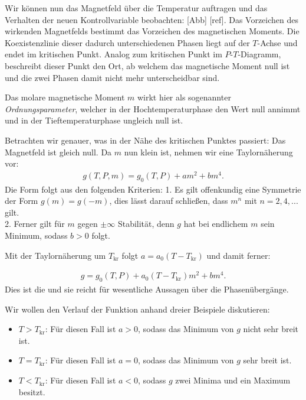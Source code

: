 Wir können nun das Magnetfeld über die Temperatur auftragen und das Verhalten der neuen Kontrollvariable beobachten: [Abb] [ref].
Das Vorzeichen des wirkenden Magnetfelds bestimmt das Vorzeichen des magnetischen Moments. Die Koexistenzlinie dieser dadurch unterschiedenen Phasen liegt auf der $T$-Achse und endet im kritischen Punkt. Analog zum kritischen Punkt im $P$-$T$-Diagramm, beschreibt dieser Punkt den Ort, ab welchem das magnetische Moment null ist und die zwei Phasen damit nicht mehr unterscheidbar sind.

Das molare magnetische Moment $m$ wirkt hier als sogenannter \emph{Ordnungsparameter}, welcher in der Hochtemperaturphase den Wert null annimmt und in der Tieftemperaturphase ungleich null ist.

Betrachten wir genauer, was in der Nähe des kritischen Punktes passiert:
Das Magnetfeld ist gleich null. Da $m$ nun klein ist, nehmen wir eine Taylornäherung vor:
\begin{align*}
    g(T,P,m)=g_0(T,P)+am^2+bm^4.
\end{align*}
Die Form folgt aus den folgenden Kriterien: 
1. Es gilt offenkundig eine Symmetrie der Form $g(m)=g(-m)$, dies lässt darauf schließen, dass $m^n$ mit $n=2,4,...$ gilt. \\
2. Ferner gilt für $m$ gegen $\pm \infty$ Stabilität, denn $g$ hat bei endlichem $m$ sein Minimum, sodass $b>0$ folgt. 

Mit der Taylornäherung um $T_\mathrm{kr}$ folgt $a=a_0(T-T_\mathrm{kr})$ und damit ferner:
\begin{formal}
    \begin{align*}
    g=g_0(T,P) +a_0(T-T_\mathrm{kr})m^2+bm^4.
\end{align*}
Dies ist die  und sie reicht für wesentliche Aussagen über die Phasenübergänge.
\end{formal}

Wir wollen den Verlauf der Funktion anhand dreier Beispiele diskutieren:
\begin{itemize}
    \item $T>T_\mathrm{kr}$: Für diesen Fall ist $a>0$, sodass das Minimum von $g$ nicht sehr breit ist.
    \item $T=T_\mathrm{kr}$: Für diesen Fall ist $a=0$, sodass  das Minimum von $g$ sehr breit ist.
    \item $T<T_\mathrm{kr}$: Für diesen Fall ist $a<0$, sodass $g$ zwei Minima und ein Maximum besitzt.
\end{itemize}


